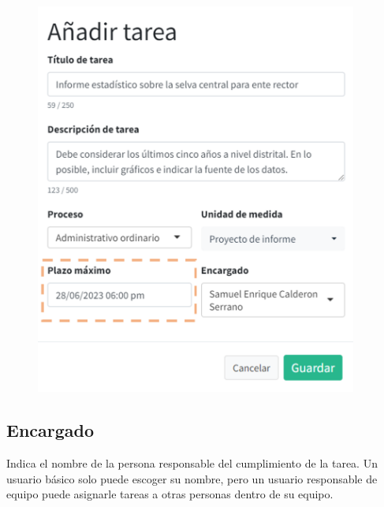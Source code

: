 \documentclass[
  letterpaper,
  DIV=11,
  numbers=noendperiod]{scrreprt}
\begin{document}
\begin{figure}

{\centering \includegraphics[width=4.16667in,height=\textheight]{./img/manual-user/new-task-timedue.png}

}

\end{figure}

\hypertarget{encargado}{%
\subsection{Encargado}\label{encargado}}

Indica el nombre de la persona responsable del cumplimiento de la tarea.
Un usuario básico solo puede escoger su nombre, pero un usuario
responsable de equipo puede asignarle tareas a otras personas dentro de
su equipo.
\end{document}
